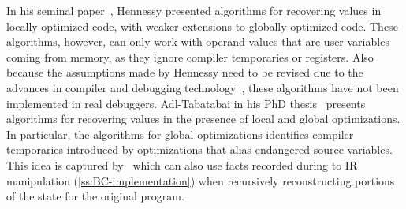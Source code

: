 In his seminal paper~\cite{Hennessy82}, Hennessy presented algorithms for recovering values in locally optimized code, with weaker extensions to globally optimized code. These algorithms, however, can only work with operand values that are user variables coming from memory, as they ignore compiler temporaries or registers. Also because the assumptions made by Hennessy need to be revised due to the advances in compiler and debugging technology~\cite{Copperman93}, these algorithms have not been implemented in real debuggers. Adl-Tabatabai in his PhD thesis~\cite{Adl-Tabatabai96thesis} presents algorithms for recovering values in the presence of local and global optimizations. In particular, the algorithms for global optimizations identifies compiler temporaries introduced by optimizations that alias endangered source variables. This idea is captured by \buildcomp\, which can also use facts recorded during to IR manipulation (\mysection\ref{ss:BC-implementation}) when recursively reconstructing portions of the state for the original program.

